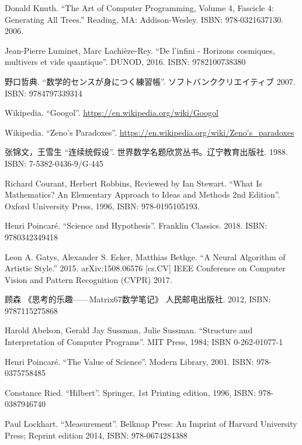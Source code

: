 \documentclass{article}
\begin{document}
\begin{thebibliography}{99}
Donald Knuth. ``The Art of Computer Programming, Volume 4, Fascicle 4: Generating All Trees.'' Reading, MA: Addison-Wesley. ISBN: 978-0321637130. 2006.

Jean-Pierre Luminet, Marc Lachièze-Rey. ``De l'infini - Horizons cosmiques, multivers et vide quantique''. DUNOD, 2016. ISBN: 9782100738380

{\fontspec{\cnmainft}野口哲典. ``数学的センスが身につく練習帳''. ソフトバンククリエイティブ} 2007. ISBN: 9784797339314

Wikipedia. ``Googol''. \url{https://en.wikipedia.org/wiki/Googol}

Wikipedia. ``Zeno's Paradoxes''. \url{https://en.wikipedia.org/wiki/Zeno's_paradoxes}

{\fontspec{\cnmainft}张锦文，王雪生 ``连续统假设''. 世界数学名题欣赏丛书。辽宁教育出版社.} 1988. ISBN: 7-5382-0436-9/G$\cdot$445

Richard Courant, Herbert Robbins, Reviewed by Ian Stewart. ``What Is Mathematics? An Elementary Approach to Ideas and Methods 2nd Edition''. Oxford University Press,  1996, ISBN: 978-0195105193.

Henri Poincaré. ``Science and Hypothesis''. Franklin Classics. 2018. ISBN: 9780342349418

Leon A. Gatys, Alexander S. Ecker, Matthias Bethge. ``A Neural Algorithm of Artistic Style.'' 2015. arXiv:1508.06576 [cs.CV] IEEE Conference on Computer Vision and Pattern Recognition (CVPR) 2017.

{\fontspec{\cnmainft}顾森 《思考的乐趣——Matrix67数学笔记》 人民邮电出版社.} 2012, ISBN: 9787115275868

Harold Abelson, Gerald Jay Sussman, Julie Sussman. ``Structure and Interpretation of Computer Programs''. MIT Press, 1984; ISBN 0-262-01077-1

Henri Poincaré. ``The Value of Science''. Modern Library, 2001. ISBN: 978-0375758485

Constance Ried. ``Hilbert''. Springer, 1st Printing edition, 1996, ISBN: 978-0387946740


Paul Lockhart. ``Measurement''. Belknap Press: An Imprint of Harvard University Press; Reprint edition 2014, ISBN: 978-0674284388

\end{thebibliography}

\ifx\wholebook\relax \else

\expandafter\enddocument

\fi
\end{document}
